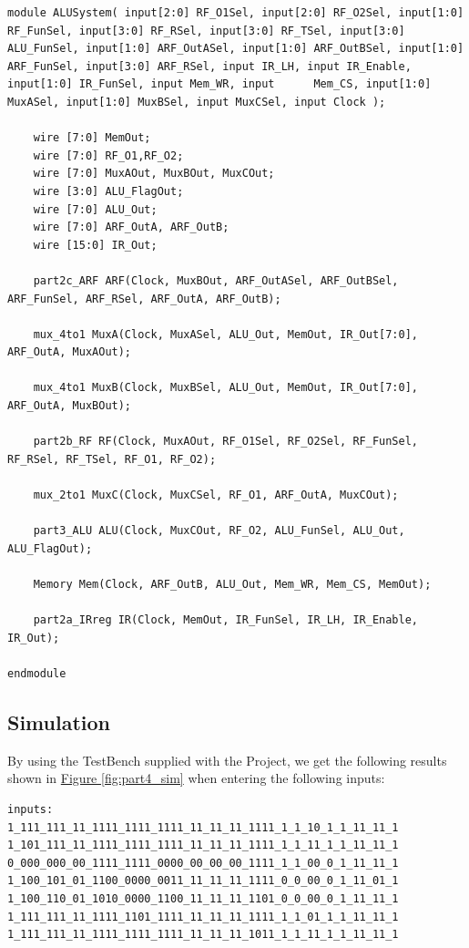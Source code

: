 \documentclass[pdftex,12pt,a4paper]{article}
\begin{document}
\begin{lstlisting}
module ALUSystem( input[2:0] RF_O1Sel, input[2:0] RF_O2Sel, input[1:0] RF_FunSel, input[3:0] RF_RSel, input[3:0] RF_TSel, input[3:0] ALU_FunSel, input[1:0] ARF_OutASel, input[1:0] ARF_OutBSel, input[1:0] ARF_FunSel, input[3:0] ARF_RSel, input IR_LH, input IR_Enable, input[1:0] IR_FunSel, input Mem_WR, input      Mem_CS, input[1:0] MuxASel, input[1:0] MuxBSel, input MuxCSel, input Clock );

    wire [7:0] MemOut;
    wire [7:0] RF_O1,RF_O2;
    wire [7:0] MuxAOut, MuxBOut, MuxCOut;
    wire [3:0] ALU_FlagOut;
    wire [7:0] ALU_Out;
    wire [7:0] ARF_OutA, ARF_OutB;
    wire [15:0] IR_Out;
    
    part2c_ARF ARF(Clock, MuxBOut, ARF_OutASel, ARF_OutBSel, ARF_FunSel, ARF_RSel, ARF_OutA, ARF_OutB);

    mux_4to1 MuxA(Clock, MuxASel, ALU_Out, MemOut, IR_Out[7:0], ARF_OutA, MuxAOut);

    mux_4to1 MuxB(Clock, MuxBSel, ALU_Out, MemOut, IR_Out[7:0], ARF_OutA, MuxBOut);

    part2b_RF RF(Clock, MuxAOut, RF_O1Sel, RF_O2Sel, RF_FunSel, RF_RSel, RF_TSel, RF_O1, RF_O2);

    mux_2to1 MuxC(Clock, MuxCSel, RF_O1, ARF_OutA, MuxCOut);

    part3_ALU ALU(Clock, MuxCOut, RF_O2, ALU_FunSel, ALU_Out, ALU_FlagOut);

    Memory Mem(Clock, ARF_OutB, ALU_Out, Mem_WR, Mem_CS, MemOut);

    part2a_IRreg IR(Clock, MemOut, IR_FunSel, IR_LH, IR_Enable, IR_Out);

endmodule
\end{lstlisting}

\subsection{Simulation}
By using the TestBench supplied with the Project, we get the following results shown in \hyperref[fig:part4_sim]{Figure \ref{fig:part4_sim}} when entering the following inputs:
\pagebreak
\begin{lstlisting}
inputs:
1_111_111_11_1111_1111_1111_11_11_11_1111_1_1_10_1_1_11_11_1
1_101_111_11_1111_1111_1111_11_11_11_1111_1_1_11_1_1_11_11_1
0_000_000_00_1111_1111_0000_00_00_00_1111_1_1_00_0_1_11_11_1
1_100_101_01_1100_0000_0011_11_11_11_1111_0_0_00_0_1_11_01_1
1_100_110_01_1010_0000_1100_11_11_11_1101_0_0_00_0_1_11_11_1
1_111_111_11_1111_1101_1111_11_11_11_1111_1_1_01_1_1_11_11_1
1_111_111_11_1111_1111_1111_11_11_11_1011_1_1_11_1_1_11_11_1
\end{lstlisting}
\end{document}
